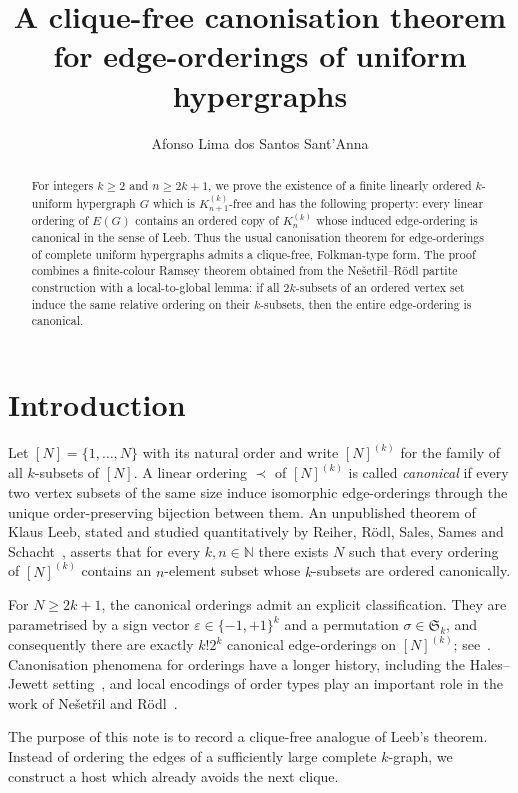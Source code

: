 \documentclass[11pt]{amsart}
\title[A clique-free canonisation theorem]{A clique-free canonisation theorem for edge-orderings of uniform hypergraphs}
\author{Afonso Lima dos Santos Sant'Anna}
\date{}
\theoremstyle{definition}
\newcommand{\N}{\mathbb{N}}
\newcommand{\eps}{\varepsilon}
\newcommand{\Sym}{\mathfrak{S}}
\begin{document}
\begin{abstract}
For integers $k\ge 2$ and $n\ge 2k+1$, we prove the existence of a finite linearly ordered $k$-uniform hypergraph $G$ which is $K_{n+1}^{(k)}$-free and has the following property: every linear ordering of $E(G)$ contains an ordered copy of $K_n^{(k)}$ whose induced edge-ordering is canonical in the sense of Leeb. Thus the usual canonisation theorem for edge-orderings of complete uniform hypergraphs admits a clique-free, Folkman-type form. The proof combines a finite-colour Ramsey theorem obtained from the Ne\v{s}et\v{r}il--R\"odl partite construction with a local-to-global lemma: if all $2k$-subsets of an ordered vertex set induce the same relative ordering on their $k$-subsets, then the entire edge-ordering is canonical.
\end{abstract}

\maketitle

\section{Introduction}

Let $[N]=\{1,\dots,N\}$ with its natural order and write $[N]^{(k)}$ for the family of all $k$-subsets of $[N]$. A linear ordering $\prec$ of $[N]^{(k)}$ is called \emph{canonical} if every two vertex subsets of the same size induce isomorphic edge-orderings through the unique order-preserving bijection between them. An unpublished theorem of Klaus Leeb, stated and studied quantitatively by Reiher, R\"odl, Sales, Sames and Schacht~\cite{RRSSS2022}, asserts that for every $k,n\in\N$ there exists $N$ such that every ordering of $[N]^{(k)}$ contains an $n$-element subset whose $k$-subsets are ordered canonically.

For $N\ge 2k+1$, the canonical orderings admit an explicit classification. They are parametrised by a sign vector $\eps\in\{-1,+1\}^k$ and a permutation $\sigma\in\Sym_k$, and consequently there are exactly $k!2^k$ canonical edge-orderings on $[N]^{(k)}$; see~\cite{RRSSS2022}. Canonisation phenomena for orderings have a longer history, including the Hales--Jewett setting~\cite{NPRV1985}, and local encodings of order types play an important role in the work of Ne\v{s}et\v{r}il and R\"odl~\cite{NR2017}.

The purpose of this note is to record a clique-free analogue of Leeb's theorem. Instead of ordering the edges of a sufficiently large complete $k$-graph, we construct a host which already avoids the next clique.
\end{document}

